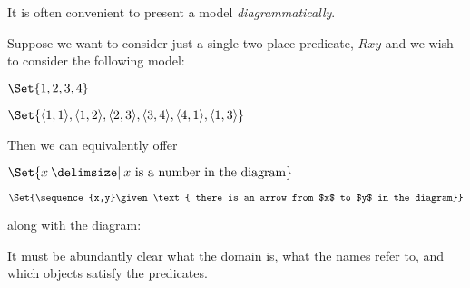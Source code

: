 It is often convenient to present a model \emph{diagrammatically}.


Suppose we want to consider just a single two-place predicate, $Rxy$ and we wish to consider the following model:
\begin{interp}
	\item[\domain]$\Set{1,2,3,4}$
	\item[\denote{R}]$\Set{
		\ntuple{1, 1},
		\ntuple{1, 2},
		\ntuple{2, 3},
		\ntuple{3, 4},
		\ntuple{4, 1},
		\ntuple{1, 3}}
		$
\end{interp}
Then we can equivalently offer
\begin{interp}
	\item[\domain]$\Set{x\given x \text{ is a number in the diagram}}$
	\item[\denote{R}]$\Set{\sequence{x,y}\given \text{ there is an arrow from $x$ to $y$ in the diagram}}$
\end{interp}
along with the diagram:
\begin{center}
\end{center}

It must be abundantly clear what the domain is, what the names refer to, and which objects satisfy the predicates. 



%


